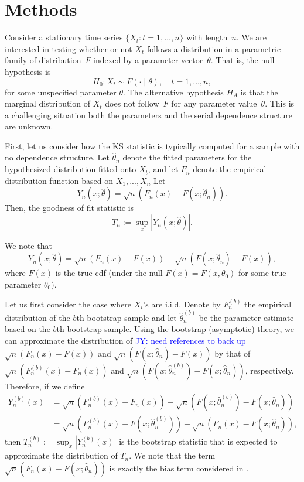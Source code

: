 \documentclass[12pt, titlepage, letterpaper]{article}
\newcommand{\jy}[1]{\textcolor{blue}{JY: #1}}
\begin{document}
{\section{Methods}
\label{sec:methods}


Consider a stationary time series $\{X_t: t = 1, \ldots, n\}$ with length~$n$.
We are interested in testing whether or not $X_t$ follows a distribution in a
parametric family of distribution~$F$ indexed by a parameter
vector~$\theta$. That is, the null hypothesis is
\[
  H_0: X_t \sim F(\cdot \mid \theta), \quad t = 1, \ldots, n,
\]
for some unspecified parameter $\theta$.
The alternative hypothesis $H_A$ is that the marginal distribution of $X_t$ does
not follow~$F$ for any parameter value~$\theta$. This is a challenging situation
both the parameters and the serial dependence structure are unknown.


First, let us consider how the KS statistic is typically computed for a sample
with no dependence structure.
Let $\hat\theta_n$ denote the fitted parameters for the hypothesized 
distribution fitted onto $X_t$, and let 
$F_n$ denote the empirical distribution function based on $X_1,...,X_n$
Let
\begin{equation*}
Y_n(x; \hat\theta) = \sqrt{n}(F_n(x) - F(x; \hat\theta_n)).
\end{equation*}
Then, the
goodness of fit statistic is 
\begin{equation*}
T_n := \sup_x|Y_n(x; \hat\theta)|.
\end{equation*}

We note that
\begin{equation*}
Y_n(x; \hat\theta) = \sqrt{n}(F_n(x) - F(x)) - 
\sqrt{n}(F(x; \hat\theta_n) - F(x)),
\end{equation*}
where $F(x)$ is the true cdf (under the null $F(x) = F(x, \theta_0)$ for some
true parameter $\theta_0$).


Let us first consider the case where $X_i$'s are i.i.d. Denote by $F^{(b)}_n$ 
the empirical distribution of the $b$th bootstrap sample and let
$\hat\theta^{(b)}_n$ be the parameter estimate based on the $b$th bootstrap 
sample. 
Using the bootstrap (asymptotic) theory, we can approximate the distribution of
\jy{need references to back up}
$\sqrt{n}(F_n(x) - F(x))$ and $\sqrt{n}(F(x; \hat\theta_n) - F(x))$
by that of $\sqrt{n}(F^{(b)}_n(x) - F_n(x))$
and
$\sqrt{n}(F(x; \hat\theta^{(b)}_n) - F(x; \hat\theta_n))$, respectively.
Therefore, if we define
\begin{align*}
Y^{(b)}_n(x) &= \sqrt{n}(F^{(b)}_n(x) - F_n(x)) - 
               \sqrt{n}(F(x; \hat\theta^{(b)}_n) - F(x; \hat\theta_n)) \\
             &= \sqrt{n}(F^{(b)}_n(x) - F(x; \hat\theta^{(b)}_n)) - 
               \sqrt{n}(F_n(x) - F(x; \hat\theta_n)),
\end{align*}
then $T^{(b)}_n := \sup_x|Y^{(b)}_n(x)|$ is the bootstrap statistic that is 
expected
to approximate the distribution of $T_n$. We note that the term
$\sqrt{n}(F_n(x) - F(x; \hat\theta_n))$ is exactly the bias term considered in 
\citet{babu2004goodness}.


}
\end{document}
